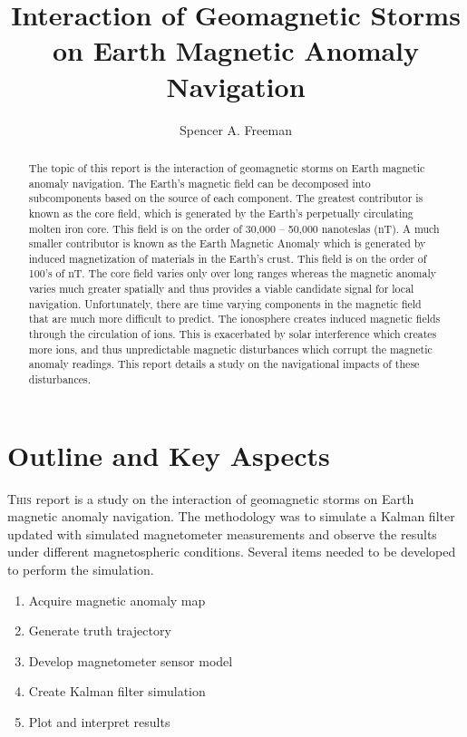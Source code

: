 \documentclass[conf]{new-aiaa}
\title{Interaction of Geomagnetic Storms on Earth Magnetic Anomaly Navigation}
\author{Spencer A. Freeman}
\affil{Virginia Tech, Blacksburg, VA, 24061}
\begin{document}
\maketitle

\begin{abstract}
The topic of this report is the interaction of geomagnetic storms on Earth magnetic anomaly navigation. The Earth’s magnetic field can be decomposed into subcomponents based on the source of each component. The greatest contributor is known as the core field, which is generated by the Earth's perpetually circulating molten iron core. This field is on the order of 30,000 – 50,000 nanoteslas (nT). A much smaller contributor is known as the Earth Magnetic Anomaly which is generated by induced magnetization of materials in the Earth’s crust. This field is on the order of 100’s of nT. The core field varies only over long ranges whereas the magnetic anomaly varies much greater spatially and thus provides a viable candidate signal for local navigation. Unfortunately, there are time varying components in the magnetic field that are much more difficult to predict. The ionosphere creates induced magnetic fields through the circulation of ions. This is exacerbated by solar interference which creates more ions, and thus unpredictable magnetic disturbances which corrupt the magnetic anomaly readings. This report details a study on the navigational impacts of these disturbances.
\end{abstract}

\section{Outline and Key Aspects}
\lettrine{T}{his} report is a study on the interaction of geomagnetic storms on Earth magnetic anomaly navigation. The methodology was to simulate a Kalman filter updated with simulated magnetometer measurements and observe the results under different magnetospheric conditions. Several items needed to be developed to perform the simulation.\\

\begin{enumerate}
   \item Acquire magnetic anomaly map
   \item Generate truth trajectory
   \item Develop magnetometer sensor model
   \item Create Kalman filter simulation 
   \item Plot and interpret results\\
\end{enumerate}
\end{document}
